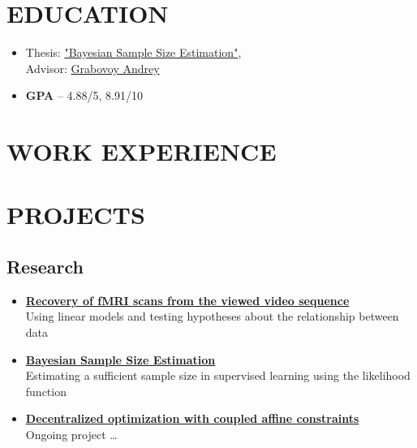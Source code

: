 \documentclass[12pt]{moderncv}
\begin{document}
    \makecvtitle

    \section{EDUCATION}

        \begin{itemize}
            \item Thesis: \href{https://github.com/intsystems/Kiselev-BS-Thesis}{"Bayesian Sample Size Estimation"},\\
            Advisor: \href{https://andriygav.github.io}{Grabovoy Andrey}
            \item \textbf{GPA} -- 4.88/5, 8.91/10
        \end{itemize}

    \section{WORK EXPERIENCE}


        \section{PROJECTS}

        \subsection{Research}

        \begin{itemize}
            \item \href{https://github.com/intsystems/2023-Project-112}{\textbf{Recovery of fMRI scans from the viewed video sequence}}\\
            Using linear models and testing hypotheses about the relationship between data
            \item \href{https://github.com/kisnikser/Bayesian-Sample-Size-Estimation}{\textbf{Bayesian Sample Size Estimation}}\\
            Estimating a sufficient sample size in supervised learning using the likelihood function
            \item \href{https://github.com/kisnikser/Decentralized-Optimization}{\textbf{Decentralized optimization with coupled affine constraints}}\\
            Ongoing project \dots
        \end{itemize}
\end{document}
